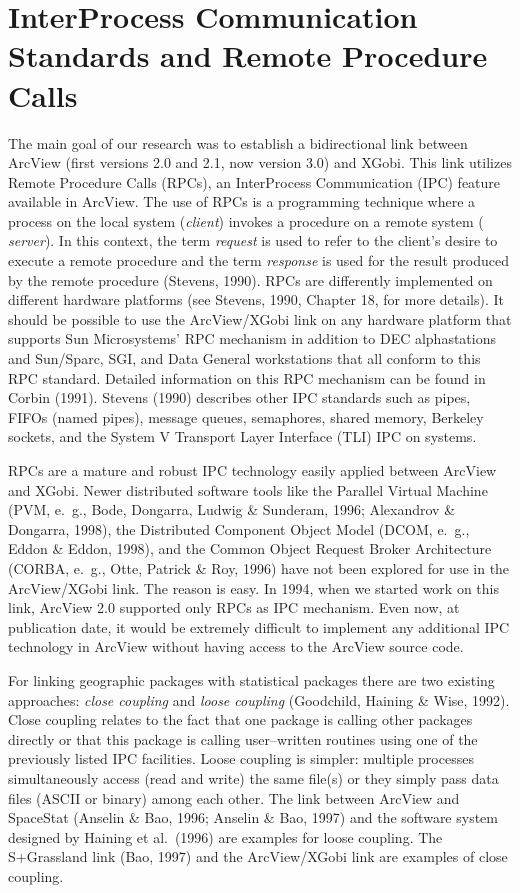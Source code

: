 \section{InterProcess Communication Standards and Remote Procedure Calls}

The main goal of our research was to establish a bidirectional link
between ArcView (first versions 2.0 and 2.1, now version 3.0) and
XGobi. This link utilizes Remote Procedure Calls (RPCs), an
InterProcess Communication (IPC) feature available in ArcView.  The
use of RPCs is a programming technique where a process on the local
system ({\em client}) invokes a procedure on a remote system ({\em
server}).  In this context, the term {\em request} is used to refer to
the client's desire to execute a remote procedure and the
term {\em response} is used for the result produced by the remote
procedure (Stevens, 1990).  
RPCs are differently implemented on different hardware platforms
(see Stevens, 1990, Chapter 18, for more details).
It should be possible to use the ArcView/XGobi link on any
hardware platform that supports Sun Microsystems' RPC mechanism
in addition to DEC alpha\-stations and
Sun/Sparc, SGI, and Data General workstations
that all conform to this RPC standard.
Detailed information on this RPC mechanism can be found
in Corbin (1991). Stevens (1990) describes other IPC standards such as
pipes, FIFOs (named pipes), message queues, semaphores, shared memory,
Berkeley sockets, and the System V Transport Layer Interface (TLI) IPC
on \UnixRfn\/ systems.

RPCs are a mature and robust IPC technology easily 
applied between ArcView and XGobi. Newer distributed software
tools like the Parallel Virtual Machine (PVM, e.~g., Bode, Dongarra,
Ludwig \& Sunderam, 1996; Alexandrov \& Dongarra, 1998),
the Distributed Component Object Model (DCOM, e.~g., Eddon \& Eddon, 1998),
and the Common Object Request Broker Architecture (CORBA, e.~g.,
Otte, Patrick \& Roy, 1996) have not been explored for use in the
ArcView/XGobi link.
The reason is easy. In 1994, when we started work on this link,
ArcView 2.0 supported only RPCs as IPC mechanism. Even now,
at publication date,
it would be extremely difficult to implement any additional IPC
technology in ArcView without having access to the ArcView source code.

For linking geographic packages with statistical packages there are
two existing approaches: {\it close coupling} and {\it loose coupling}
(Goodchild, Haining \& Wise, 1992). Close coupling relates to the fact
that one package is calling other packages directly or that
this package is calling user--written
routines using one of the previously listed IPC facilities. Loose coupling is
simpler: multiple processes simultaneously access (read and write) the
same file(s) or they simply pass data files (ASCII or binary) among each
other. The link between ArcView and Space\-Stat (Anselin \& Bao, 1996;
Anselin \& Bao, 1997)
and the software system designed by Haining et al.\ (1996) are
examples for loose coupling.  The S+Grassland link (Bao, 1997) and the
ArcView/XGobi link are examples of close coupling.

